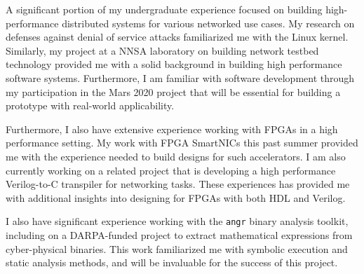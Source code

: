 \documentclass[11pt]{article}
\begin{document}
A significant portion of my undergraduate experience focused on building high-performance distributed systems for various networked use cases.
My research on defenses against denial of service attacks familiarized me with the Linux kernel.
Similarly, my project at a NNSA laboratory on building network testbed technology provided me with a solid background in building high performance software systems.
Furthermore, I am familiar with software development through my participation in the Mars 2020 project that will be essential for building a prototype with real-world applicability.

Furthermore, I also have extensive experience working with FPGAs in a high performance setting.
My work with FPGA SmartNICs this past summer provided me with the experience needed to build designs for such accelerators.
I am also currently working on a related project that is developing a high performance Verilog-to-C transpiler for networking tasks.
These experiences has provided me with additional insights into designing for FPGAs with both HDL and Verilog.

I also have significant experience working with the \texttt{angr} binary analysis toolkit, including on a DARPA-funded project to extract mathematical expressions from cyber-physical binaries.
This work familiarized me with symbolic execution and static analysis methods, and will be invaluable for the success of this project.

\newpage

\printbibliography
\end{document}
